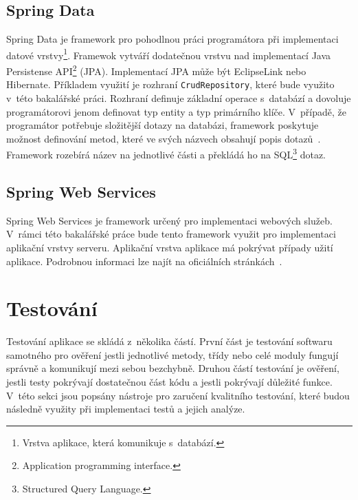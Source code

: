     \subsection{Spring Data}
        Spring Data je framework pro pohodlnou práci programátora při implementaci datové vrstvy\footnote{Vrstva aplikace, která komunikuje s~databází.}. Framewok vytváří dodatečnou vrstvu nad implementací Java Persistense API\footnote{Application programming interface.} (JPA). Implementací JPA může být EclipseLink nebo Hibernate. Příkladem využití je rozhraní \texttt{CrudRepository}, které bude využito v~této bakalářské práci. Rozhraní definuje základní operace s~databází a dovoluje programátorovi jenom definovat typ entity a typ primárního klíče. V~případě, že programátor potřebuje složitější dotazy na databázi, framework poskytuje možnost definování metod, které ve svých názvech obsahují popis dotazů~\cite{query-methods}. Framework rozebírá název na jednotlivé části a překládá ho na SQL\footnote{Structured Query Language.} dotaz.
    
    \subsection{Spring Web Services}
        Spring Web Services je framework určený pro implementaci webových služeb. V~rámci této bakalářské práce bude tento framework využit pro implementaci aplikační vrstvy serveru. Aplikační vrstva aplikace má pokrývat případy užití aplikace. Podrobnou informaci lze najít na oficiálních stránkách~\cite{spring-web-services}.
        

    
\section{Testování}\label{reserse:testovani}
    Testování aplikace se skládá z~několika částí. První část je testování softwaru samotného pro ověření jestli jednotlivé metody, třídy nebo celé moduly fungují správně a komunikují mezi sebou bezchybně. Druhou částí testování je ověření, jestli testy pokrývají dostatečnou část kódu a jestli pokrývají důležité funkce. V~této sekci jsou popsány nástroje pro zaručení kvalitního testování, které budou následně využity při implementaci testů a jejich analýze.
    
